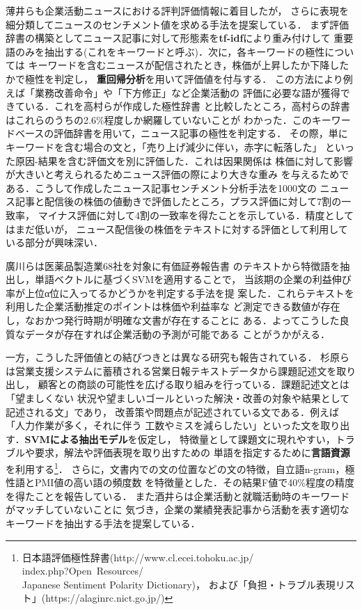 \documentclass[twocolumn]{jarticle}
\begin{document}
薄井ら\cite{usui2014}も企業活動ニュースにおける評判評価情報に着目したが，
さらに表現を細分類してニュースのセンチメント値を求める手法を提案している．
まず評価辞書の構築としてニュース記事に対して形態素を{\bf tf-idf}により重み付けして
重要語のみを抽出する(これをキーワードと呼ぶ)．次に，各キーワードの極性については
キーワードを含むニュースが配信されたとき，株価が上昇したか下降したかで極性を判定し，
{\bf 重回帰分析}を用いて評価値を付与する．
この方法により例えば「業務改善命令」や「下方修正」など企業活動の
評価に必要な語が獲得できている．これを高村らが作成した極性辞書\cite{takamura05}
と比較したところ，高村らの辞書はこれらのうちの2.6\%程度しか網羅していないことが
わかった．このキーワードベースの評価辞書を用いて，ニュース記事の極性を判定する．
その際，単にキーワードを含む場合の文と，「売り上げ減少に伴い，赤字に転落した」
といった原因-結果を含む評価文を別に評価した．これは因果関係は
株価に対して影響が大きいと考えられるためニュース評価の際により大きな重み
を与えるためである．こうして作成したニュース記事センチメント分析手法を1000文の
ニュース記事と配信後の株価の値動きで評価したところ，プラス評価に対して7割の一致率，
マイナス評価に対して4割の一致率を得たことを示している．精度としてはまだ低いが，
ニュース配信後の株価をテキストに対する評価として利用している部分が興味深い．

廣川\cite{hirokawa2013}らは医薬品製造業68社を対象に有価証券報告書
のテキストから特徴語を抽出し，単語ベクトルに基づくSVMを適用することで，
当該期の企業の利益伸び率が上位α位に入ってるかどうかを判定する手法を提
案した．これらテキストを利用した企業活動推定のポイントは株価や利益率な
ど測定できる数値が存在し，なおかつ発行時期が明確な文書が存在することに
ある．よってこうした良質なデータが存在すれば企業活動の予測が可能である
ことがうかがえる．

一方，こうした評価値との結びつきとは異なる研究も報告されている．
杉原ら\cite{sugihara2012}は営業支援システムに蓄積される営業日報テキストデータから課題記述文を取り出し，
顧客との商談の可能性を広げる取り組みを行っている．課題記述文とは「望ましくない
状況や望ましいゴールといった解決・改善の対象や結果として記述される文」であり，
改善策や問題点が記述されている文である．例えば「人力作業が多く，それに伴う
工数やミスを減らしたい」といった文を取り出す．{\bf SVMによる抽出モデル}を仮定し，
特徴量として課題文に現れやすい，トラブルや要求，解法や評価表現を取り出すための
単語を指定するために{\bf 言語資源}を利用する\footnote{日本語評価極性辞書(http://www.cl.ecei.tohoku.ac.jp/ \\
index.php?Open~Resources\slash{} \\ Japanese Sentiment  Polarity Dictionary)，
および「負担・トラブル表現リスト」(https://alaginrc.nict.go.jp/)}．
さらに，文書内での文の位置などの文の特徴，自立語n-gram，極性語とPMI値の高い語の頻度数
を特徴量とした．その結果F値で40\%程度の精度を得たことを報告している．
また酒井\cite{sakai2014}らは企業活動と就職活動時のキーワードがマッチしていないことに
気づき，企業の業績発表記事から活動を表す適切なキーワードを抽出する手法を提案している．
\end{document}

